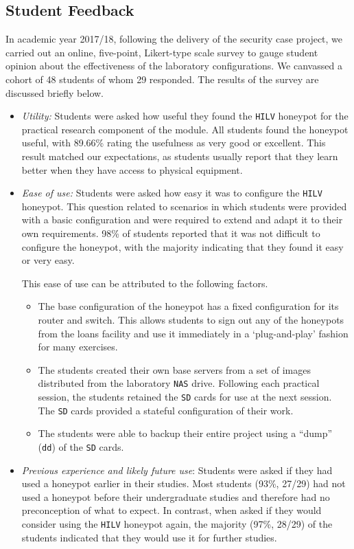 \documentclass{ieeeaccess}
\begin{document}
\subsection{Student Feedback}\label{sec:Feedback}
In academic year 2017/18, following the delivery of the security case project,
we carried out an online, five-point, Likert-type scale survey to gauge student
opinion about the effectiveness of the laboratory configurations. We canvassed
a cohort of 48 students of whom 29 responded. The results of the survey are
discussed briefly below.
\begin{itemize}
  \item \noindent\textit{Utility:} Students were asked how useful they found the
\texttt{HILV} honeypot for the practical research component of the module. All
students found the honeypot useful, with 89.66\% rating the usefulness as very
good or excellent. This result matched our expectations, as students usually
report that they learn better when they have access to physical equipment. 
  \item \noindent\textit{Ease of use:} Students were asked how easy it was to
configure the \texttt{HILV} honeypot. This question related to scenarios in
which students were provided with a basic configuration and were required to
extend and adapt it to their own requirements. 98\% of students reported that
it was not difficult to configure the honeypot, with the majority indicating
that they found it easy or very easy. 
\par\noindent This ease of use can be attributed to the following factors.
  \begin{itemize} 
    \item The base configuration of the honeypot has a fixed configuration for
      its router and switch. This allows students to sign out any of the
      honeypots from the loans facility and use it immediately in a
      `plug-and-play' fashion for many exercises.  
    \item The students created their own base servers from a set of images
      distributed from the laboratory \texttt{NAS} drive.  Following each
      practical session, the students retained the \texttt{SD} cards for use at
      the next session. The \texttt{SD} cards provided a stateful configuration
      of their work.  
    \item The students were able to backup their entire project using a ``dump''
      (\texttt{dd}) of the \texttt{SD} cards.
  \end{itemize}
  \item \noindent\textit{Previous experience and likely future use}: Students
were asked if they had used a honeypot earlier in their studies. Most students
(93\%, 27/29) had not used a honeypot before their undergraduate studies and
therefore had no preconception of what to expect. In contrast, when asked if
they would consider using the \texttt{HILV} honeypot again, the majority
(97\%, 28/29) of the students indicated that they would use it for further studies. 
\end{itemize}
\end{document}
